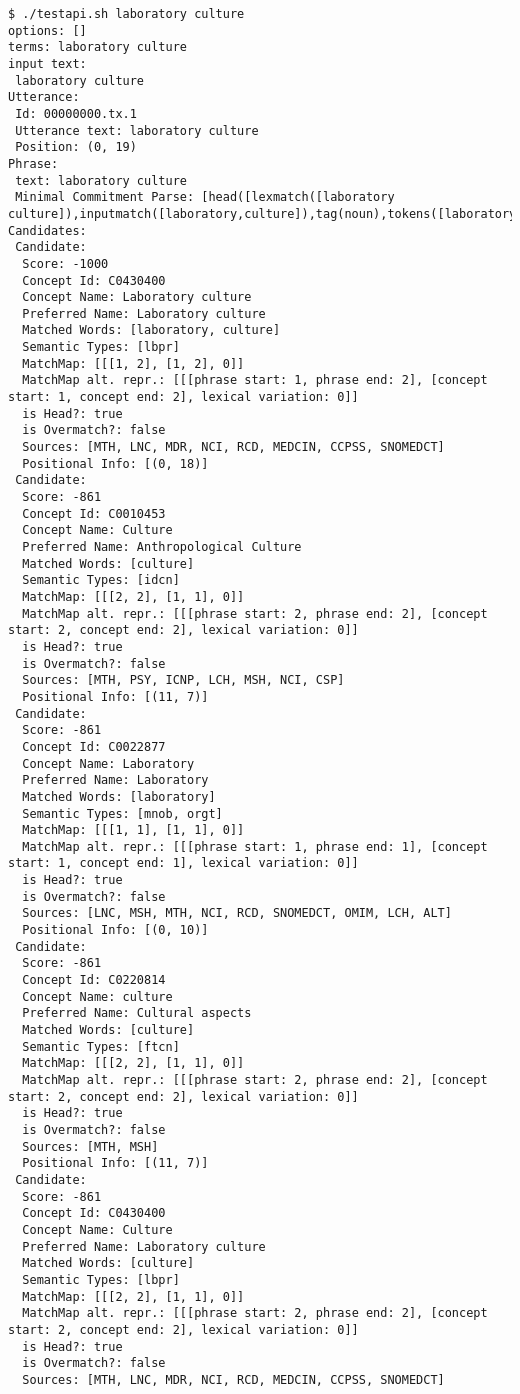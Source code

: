 \documentclass[11pt]{article}
\begin{document}
\begin{verbatim}
$ ./testapi.sh laboratory culture
options: []
terms: laboratory culture 
input text: 
 laboratory culture 
Utterance:
 Id: 00000000.tx.1
 Utterance text: laboratory culture 
 Position: (0, 19)
Phrase:
 text: laboratory culture
 Minimal Commitment Parse: [head([lexmatch([laboratory culture]),inputmatch([laboratory,culture]),tag(noun),tokens([laboratory,culture])])]
Candidates:
 Candidate:
  Score: -1000
  Concept Id: C0430400
  Concept Name: Laboratory culture
  Preferred Name: Laboratory culture
  Matched Words: [laboratory, culture]
  Semantic Types: [lbpr]
  MatchMap: [[[1, 2], [1, 2], 0]]
  MatchMap alt. repr.: [[[phrase start: 1, phrase end: 2], [concept start: 1, concept end: 2], lexical variation: 0]]
  is Head?: true
  is Overmatch?: false
  Sources: [MTH, LNC, MDR, NCI, RCD, MEDCIN, CCPSS, SNOMEDCT]
  Positional Info: [(0, 18)]
 Candidate:
  Score: -861
  Concept Id: C0010453
  Concept Name: Culture
  Preferred Name: Anthropological Culture
  Matched Words: [culture]
  Semantic Types: [idcn]
  MatchMap: [[[2, 2], [1, 1], 0]]
  MatchMap alt. repr.: [[[phrase start: 2, phrase end: 2], [concept start: 2, concept end: 2], lexical variation: 0]]
  is Head?: true
  is Overmatch?: false
  Sources: [MTH, PSY, ICNP, LCH, MSH, NCI, CSP]
  Positional Info: [(11, 7)]
 Candidate:
  Score: -861
  Concept Id: C0022877
  Concept Name: Laboratory
  Preferred Name: Laboratory
  Matched Words: [laboratory]
  Semantic Types: [mnob, orgt]
  MatchMap: [[[1, 1], [1, 1], 0]]
  MatchMap alt. repr.: [[[phrase start: 1, phrase end: 1], [concept start: 1, concept end: 1], lexical variation: 0]]
  is Head?: true
  is Overmatch?: false
  Sources: [LNC, MSH, MTH, NCI, RCD, SNOMEDCT, OMIM, LCH, ALT]
  Positional Info: [(0, 10)]
 Candidate:
  Score: -861
  Concept Id: C0220814
  Concept Name: culture
  Preferred Name: Cultural aspects
  Matched Words: [culture]
  Semantic Types: [ftcn]
  MatchMap: [[[2, 2], [1, 1], 0]]
  MatchMap alt. repr.: [[[phrase start: 2, phrase end: 2], [concept start: 2, concept end: 2], lexical variation: 0]]
  is Head?: true
  is Overmatch?: false
  Sources: [MTH, MSH]
  Positional Info: [(11, 7)]
 Candidate:
  Score: -861
  Concept Id: C0430400
  Concept Name: Culture
  Preferred Name: Laboratory culture
  Matched Words: [culture]
  Semantic Types: [lbpr]
  MatchMap: [[[2, 2], [1, 1], 0]]
  MatchMap alt. repr.: [[[phrase start: 2, phrase end: 2], [concept start: 2, concept end: 2], lexical variation: 0]]
  is Head?: true
  is Overmatch?: false
  Sources: [MTH, LNC, MDR, NCI, RCD, MEDCIN, CCPSS, SNOMEDCT]

\end{verbatim}
\end{document}
